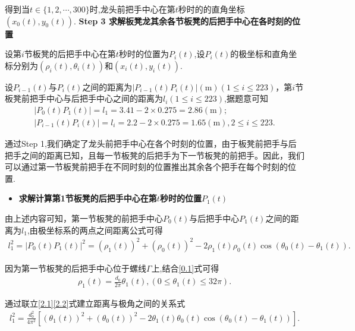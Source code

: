 \documentclass[../main.tex]{subfiles}
\begin{document}
          \par 得到当\(t\in \{ 1,2,\cdots ,300 \}\)时,龙头前把手中心在第\(t\)秒时的的直角坐标\((x_0(t),y_0(t))\).
          \textbf{Step 3 求解板凳龙其余各节板凳的后把手中心在各时刻的位置}
      \par 设第\(i\)节板凳的后把手中心在第\(t\)秒时的位置为\(P_{i}(t)\),设\(P_{i}(t)\)的极坐标和直角坐标分别为\((\rho _{i}(t),\theta _{i}(t))\)和\((x_{i}(t),y_{i}(t))\).
      \par 设\(P_{i-1}(t)\)与\(P_{i}(t)\)之间的距离为\(| P_{i-1}(t)P_{i}(t)|(\mathrm{m}) (1\leqslant i\leqslant 223)\)，第$i$节板凳前把手中心与后把手中心之间的距离为\(l_i(1\leq i\leq 223)\),据题意可知
  \begin{gather}\label{1.........4}
  | P_0(t)P_1(t)| = l_1 = 3.41 - 2\times 0.275 = 2.86(\mathrm{m});
  \\
  | P_{i-1}(t)P_{i}(t)| = l_i = 2.2 - 2\times 0.275 = 1.65(\mathrm{m}),2\leqslant i\leqslant 223.
  \end{gather}
  \par 通过Step 1,我们确定了龙头前把手中心在各个时刻的位置，由于板凳前把手与后把手之间的距离已知，且每一节板凳的后把手为下一节板凳的前把手。因此，我们可以通过第一节板凳前把手在不同时刻的位置推出其余各个把手在每个时刻的位置.
  \begin{itemize}
  \item \textbf{求解计算第1节板凳的后把手中心在第\(t\)秒时的位置\(P_1(t)\)}
  \end{itemize}
  \par 由上述内容可知，第一节板凳的前把手中心$P_0(t)$与后把手中心$P_1(t)$之间的距离为$l_{1}$,由极坐标系的两点之间距离公式可得
  \begin{align}
  l_{1}^{2}=| P_0(t)P_1(t)|^2=(\rho _1(t))^2+(\rho _0(t))^2 - 2\rho _1(t)\rho _0(t)\cos (\theta _0(t)-\theta _1(t)) .\label{2.1} 
  \end{align}
  \par 因为第一节板凳的后把手中心位于螺线\(\varGamma\)上,结合\eqref{0.1}式可得
  \begin{align}
  \rho _1(t)=\frac{d_0}{2\pi}\theta _1(t),(0\leqslant \theta _1(t)\leqslant 32\pi) .\label{2.2}
  \end{align}
  \par 通过联立\eqref{2.1}\eqref{2.2}式建立距离与极角之间的关系式
  \begin{align}
  l_{1}^{2}=\frac{d_{0}^{2}}{4\pi ^2}[(\theta _1(t))^2+(\theta _0(t))^2 - 2\theta _1(t)\theta _0(t)\cos (\theta _0(t)-\theta _1(t))] .\label{2.0}
  \end{align}
\end{document}

